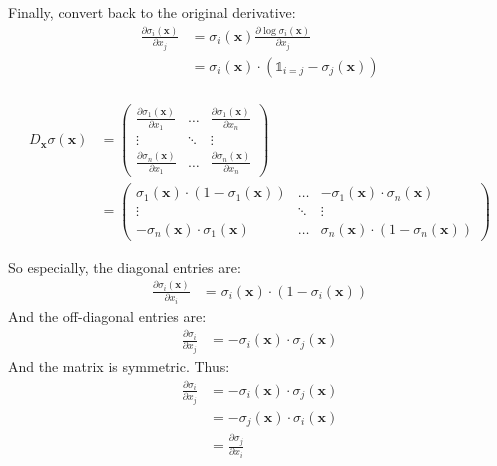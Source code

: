 Finally, convert back to the original derivative:
\begin{align*}
\frac{\partial \sigma_i(\boldsymbol{x})}{\partial x_j} &= \sigma_i(\boldsymbol{x}) \frac{\partial \log\sigma_i(\boldsymbol{x})}{\partial x_j} \\
&= \sigma_i(\boldsymbol{x}) \cdot \left(\mathds{1}_{i=j} - \sigma_j(\boldsymbol{x})\right) \\
\end{align*}


\begin{align*}
D_{\boldsymbol{x}}\sigma(\boldsymbol{x}) &=
\begin{pmatrix}
\frac{\partial \sigma_1(\boldsymbol{x})}{\partial x_1} & \dots & \frac{\partial \sigma_1(\boldsymbol{x})}{\partial x_n} \\
\vdots & \ddots & \vdots \\
\frac{\partial \sigma_n(\boldsymbol{x})}{\partial x_1} & \dots & \frac{\partial \sigma_n(\boldsymbol{x})}{\partial x_n}
\end{pmatrix} \\
&=
\begin{pmatrix}
\sigma_1(\boldsymbol{x}) \cdot (1 - \sigma_1(\boldsymbol{x})) & \dots & -\sigma_1(\boldsymbol{x}) \cdot \sigma_n(\boldsymbol{x}) \\
\vdots & \ddots & \vdots \\
-\sigma_n(\boldsymbol{x}) \cdot \sigma_1(\boldsymbol{x}) & \dots & \sigma_n(\boldsymbol{x}) \cdot (1 - \sigma_n(\boldsymbol{x}))
\end{pmatrix}
\end{align*}

So especially, the diagonal entries are:
\begin{align*}
\frac{\partial \sigma_i(\boldsymbol{x})}{\partial x_i} &= \sigma_i(\boldsymbol{x}) \cdot (1 - \sigma_i(\boldsymbol{x}))
\end{align*}
And the off-diagonal entries are:
\begin{align*}
\frac{\partial \sigma_i}{\partial x_j} &= -\sigma_i(\boldsymbol{x}) \cdot \sigma_j(\boldsymbol{x})
\end{align*}
And the matrix is symmetric. Thus:
\begin{align*}
\frac{\partial \sigma_i}{\partial x_j} &= -\sigma_i(\boldsymbol{x}) \cdot \sigma_j(\boldsymbol{x}) \\
&= -\sigma_j(\boldsymbol{x}) \cdot \sigma_i(\boldsymbol{x}) \\
&= \frac{\partial \sigma_j}{\partial x_i}
\end{align*}


